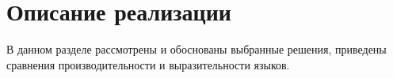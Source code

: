 \section{Описание реализации}
В данном разделе рассмотрены и обоснованы выбранные решения, приведены сравнения производительности и выразительности языков.




